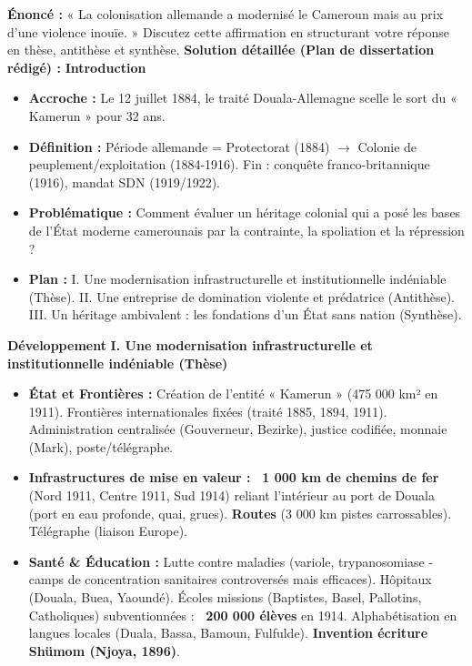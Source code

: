 \documentclass[11pt]{article}
\begin{document}
\begin{exoresolu}
\textbf{Énoncé :} « La colonisation allemande a modernisé le Cameroun mais au prix d'une violence inouïe. » Discutez cette affirmation en structurant votre réponse en thèse, antithèse et synthèse.
\tcblower
\textbf{Solution détaillée (Plan de dissertation rédigé) :}
\textbf{Introduction}
\begin{itemize}
    \item \textbf{Accroche :} Le 12 juillet 1884, le traité Douala-Allemagne scelle le sort du « Kamerun » pour 32 ans.
    \item \textbf{Définition :} Période allemande = Protectorat (1884) $\rightarrow$ Colonie de peuplement/exploitation (1884-1916). Fin : conquête franco-britannique (1916), mandat SDN (1919/1922).
    \item \textbf{Problématique :} Comment évaluer un héritage colonial qui a posé les bases de l'État moderne camerounais par la contrainte, la spoliation et la répression ?
    \item \textbf{Plan :} I. Une modernisation infrastructurelle et institutionnelle indéniable (Thèse). II. Une entreprise de domination violente et prédatrice (Antithèse). III. Un héritage ambivalent : les fondations d'un État sans nation (Synthèse).
\end{itemize}
\textbf{Développement}
\textbf{I. Une modernisation infrastructurelle et institutionnelle indéniable (Thèse)}
\begin{itemize}
    \item \textbf{État et Frontières :} Création de l'entité « Kamerun » (475 000 km² en 1911). Frontières internationales fixées (traité 1885, 1894, 1911). Administration centralisée (Gouverneur, Bezirke), justice codifiée, monnaie (Mark), poste/télégraphe.
    \item \textbf{Infrastructures de mise en valeur :} \textbf{~1 000 km de chemins de fer} (Nord 1911, Centre 1911, Sud 1914) reliant l'intérieur au port de Douala (port en eau profonde, quai, grues). \textbf{Routes} (3 000 km pistes carrossables). Télégraphe (liaison Europe).
    \item \textbf{Santé \& Éducation :} Lutte contre maladies (variole, trypanosomiase - camps de concentration sanitaires controversés mais efficaces). Hôpitaux (Douala, Buea, Yaoundé). Écoles missions (Baptistes, Basel, Pallotins, Catholiques) subventionnées : \textbf{~200 000 élèves} en 1914. Alphabétisation en langues locales (Duala, Bassa, Bamoun, Fulfulde). \textbf{Invention écriture Shümom (Njoya, 1896)}.

\end{itemize}
\end{exoresolu}
\end{document}
